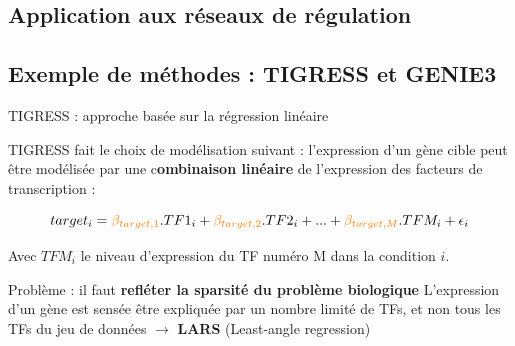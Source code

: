 \subsection{Application aux réseaux de régulation}



\subsection{Exemple de méthodes : TIGRESS et GENIE3}
	
	\begin{frame}{TIGRESS : approche basée sur la régression linéaire}

TIGRESS fait le choix de modélisation suivant : l'expression d'un gène cible peut être modélisée par une c\textbf{ombinaison linéaire} de l'expression des facteurs de transcription :
    
    \begin{equation*}
    	   target_i = \textcolor{orange}{\beta_{target,1}}.TF1_i + \textcolor{orange}{\beta_{target,2}}.TF2_i + ... + \textcolor{orange}{\beta_{target,M}}.TFM_i  + \epsilon_i
    \end{equation*}
    
Avec $TFM_i$ le niveau d'expression du TF numéro M dans la condition $i$.
\vspace{0.3cm}


\begin{alertblock}{\small Problème : il faut \textbf{refléter la sparsité du problème biologique}}
\small L'expression d'un gène est sensée être expliquée par un nombre limité de TFs, et non tous les TFs du jeu de données $\rightarrow$ \textbf{LARS} (Least-angle regression)
\end{alertblock}

\end{frame}



